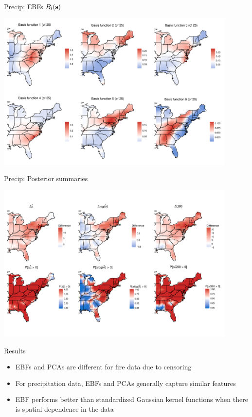 \documentclass{beamer}
\begin{document}
\begin{frame}{Precip: EBFs $B_l(\mathbf{s})$}
	\begin{center}
		\includegraphics[width=0.9\textwidth]{precip-ebf-panel}
	\end{center}
\end{frame}

\begin{frame}{Precip: Posterior summaries}
	\begin{center}
		\includegraphics[width=0.9\textwidth]{precip-ebf-postpanel-slides}
	\end{center}
\end{frame}

\begin{frame}{Results}
	\begin{itemize} \setlength{\itemsep}{1em}
		\item EBFs and PCAs are different for fire data due to censoring
		\item For precipitation data, EBFs and PCAs generally capture similar features
		\item EBF performs better than standardized Gaussian kernel functions when there is spatial dependence in the data
	\end{itemize}
\end{frame}
\end{document}

